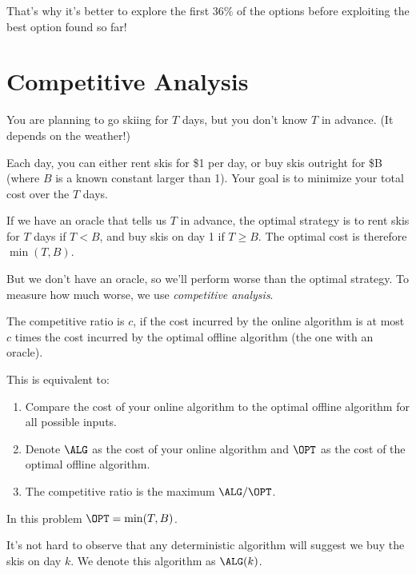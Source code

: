 That's why it's better to explore the first $36\%$ of the options before exploiting the best option found so far!

\chapter{Competitive Analysis}

\begin{question}
  You are planning to go skiing for $T$ days, but you don't know $T$ in advance. (It depends on the weather!)

  Each day, you can either rent skis for \$1 per day, or buy skis outright for \$B (where $B$ is a known constant larger than 1). Your goal is to minimize your total cost over the $T$ days.
\end{question}

If we have an oracle that tells us $T$ in advance, the optimal strategy is to rent skis for $T$ days if $T < B$, and buy skis on day 1 if $T \geq B$. The optimal cost is therefore $\min(T, B)$.

But we don't have an oracle, so we'll perform worse than the optimal strategy. To measure how much worse, we use \textit{competitive analysis}.

\begin{definition}
  The competitive ratio is $c$, if the cost incurred by the online algorithm is at most $c$ times the cost incurred by the optimal offline algorithm (the one with an oracle).
\end{definition}

\begin{remark}
  This is equivalent to:
  \begin{enumerate}
    \item Compare the cost of your online algorithm to the optimal offline algorithm for all possible inputs.
    \item Denote $\ALG$ as the cost of your online algorithm and $\OPT$ as the cost of the optimal offline algorithm.
    \item The competitive ratio is the maximum $\ALG / \OPT$.
  \end{enumerate}
\end{remark}

In this problem $\OPT = \min(T, B)$.

It's not hard to observe that any deterministic algorithm will suggest we buy the skis on day $k$. We denote this algorithm as $\ALG(k)$.

